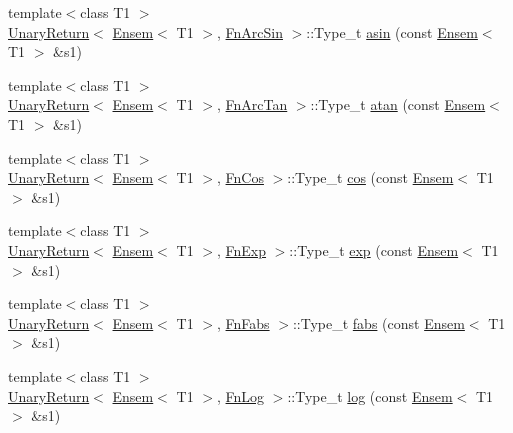 \begin{DoxyCompactItemize}
\item 
{\footnotesize template$<$class T1 $>$ }\\\mbox{\hyperlink{structENSEM_1_1UnaryReturn}{Unary\+Return}}$<$ \mbox{\hyperlink{classENSEM_1_1Ensem}{Ensem}}$<$ T1 $>$, \mbox{\hyperlink{structENSEM_1_1FnArcSin}{Fn\+Arc\+Sin}} $>$\+::Type\+\_\+t \mbox{\hyperlink{group__eensem_gada63412fd27e80930e9d85703ba2394b}{asin}} (const \mbox{\hyperlink{classENSEM_1_1Ensem}{Ensem}}$<$ T1 $>$ \&s1)
\item 
{\footnotesize template$<$class T1 $>$ }\\\mbox{\hyperlink{structENSEM_1_1UnaryReturn}{Unary\+Return}}$<$ \mbox{\hyperlink{classENSEM_1_1Ensem}{Ensem}}$<$ T1 $>$, \mbox{\hyperlink{structENSEM_1_1FnArcTan}{Fn\+Arc\+Tan}} $>$\+::Type\+\_\+t \mbox{\hyperlink{group__eensem_gaa9d40be37b4214b6c8f1e94f6a52dea3}{atan}} (const \mbox{\hyperlink{classENSEM_1_1Ensem}{Ensem}}$<$ T1 $>$ \&s1)
\item 
{\footnotesize template$<$class T1 $>$ }\\\mbox{\hyperlink{structENSEM_1_1UnaryReturn}{Unary\+Return}}$<$ \mbox{\hyperlink{classENSEM_1_1Ensem}{Ensem}}$<$ T1 $>$, \mbox{\hyperlink{structENSEM_1_1FnCos}{Fn\+Cos}} $>$\+::Type\+\_\+t \mbox{\hyperlink{group__eensem_gac1023736758024ac0b3d64cf9021b716}{cos}} (const \mbox{\hyperlink{classENSEM_1_1Ensem}{Ensem}}$<$ T1 $>$ \&s1)
\item 
{\footnotesize template$<$class T1 $>$ }\\\mbox{\hyperlink{structENSEM_1_1UnaryReturn}{Unary\+Return}}$<$ \mbox{\hyperlink{classENSEM_1_1Ensem}{Ensem}}$<$ T1 $>$, \mbox{\hyperlink{structENSEM_1_1FnExp}{Fn\+Exp}} $>$\+::Type\+\_\+t \mbox{\hyperlink{group__eensem_ga98866485949365e5677de99a9cbe2a93}{exp}} (const \mbox{\hyperlink{classENSEM_1_1Ensem}{Ensem}}$<$ T1 $>$ \&s1)
\item 
{\footnotesize template$<$class T1 $>$ }\\\mbox{\hyperlink{structENSEM_1_1UnaryReturn}{Unary\+Return}}$<$ \mbox{\hyperlink{classENSEM_1_1Ensem}{Ensem}}$<$ T1 $>$, \mbox{\hyperlink{structENSEM_1_1FnFabs}{Fn\+Fabs}} $>$\+::Type\+\_\+t \mbox{\hyperlink{group__eensem_ga6639ef2f6996bfe1d8daa6ba09d52acb}{fabs}} (const \mbox{\hyperlink{classENSEM_1_1Ensem}{Ensem}}$<$ T1 $>$ \&s1)
\item 
{\footnotesize template$<$class T1 $>$ }\\\mbox{\hyperlink{structENSEM_1_1UnaryReturn}{Unary\+Return}}$<$ \mbox{\hyperlink{classENSEM_1_1Ensem}{Ensem}}$<$ T1 $>$, \mbox{\hyperlink{structENSEM_1_1FnLog}{Fn\+Log}} $>$\+::Type\+\_\+t \mbox{\hyperlink{group__eensem_gade72fe6a4a31fa197d470c2ea6ce63a8}{log}} (const \mbox{\hyperlink{classENSEM_1_1Ensem}{Ensem}}$<$ T1 $>$ \&s1)

\end{DoxyCompactItemize}
